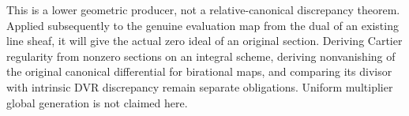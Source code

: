 This is a lower geometric producer, not a relative-canonical discrepancy theorem.
Applied subsequently to the genuine evaluation map from the dual of an existing
line sheaf, it will give the actual zero ideal of an original section.
Deriving Cartier regularity from nonzero sections on an integral scheme,
deriving nonvanishing of the original canonical differential for birational maps,
and comparing its divisor with intrinsic DVR discrepancy remain separate obligations.
Uniform multiplier global generation is not claimed here.
